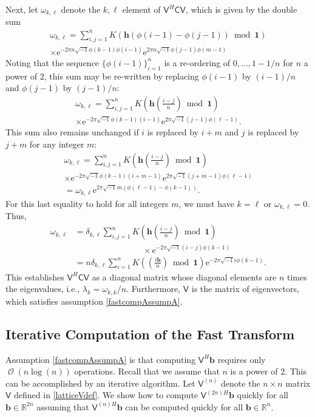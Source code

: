 \documentclass[twocolumn]{svjour3}          %
\DeclareMathOperator{\Order}{{\mathcal O}}
\newcommand{\bm}[1]{\boldsymbol{#1}}
\newcommand{\reals}{\mathbb{R}}
\newcommand{\vb}{\bm{b}}
\newcommand{\vh}{\bm{h}}
\newcommand{\vone}{\bm{1}}
\newcommand{\mC}{\mathsf{C}}
\newcommand{\mV}{\mathsf{V}}
\newcommand{\me}{\mathrm{e}}
\begin{document}
Next, let $\omega_{k, \ell}$ denote the $k,\ell$ element of $\mV^H \mC \mV$, which is given by the double sum
\begin{multline*}
\omega_{k, \ell} = \sum_{i,j=1}^n K(\vh(\phi(i-1) - \phi(j-1)) \bmod \vone ) \\
\times   \me^{-2 \pi n \sqrt{-1} \phi(k-1)\phi(i-1)}  \me^{2 \pi n \sqrt{-1} \phi(j-1)\phi(m-1)}
\end{multline*}
Noting that the sequence $\{\phi(i-1)\}_{i=1}^n$ is a re-ordering of $0, \ldots, 1-1/n$ for $n$ a power of $2$, this sum may be re-written by replacing $\phi(i-1)$ by $(i-1)/n$ and $\phi(j-1)$ by $(j-1)/n$:
\begin{multline*}
\omega_{k, \ell} = \sum_{i,j=1}^n K\left (\vh \left(\frac{i-j}{n} \right) \bmod \vone \right) \\
\times   \me^{-2 \pi \sqrt{-1} \phi(k-1)(i-1)}  \me^{2 \pi \sqrt{-1} (j-1)\phi(\ell-1)}.
\end{multline*}
This sum also remains unchanged if $i$ is replaced by $i+m$ and $j$ is replaced by $j+m$ for any integer $m$:
\begin{multline*}
\omega_{k, \ell} = \sum_{i,j=1}^n K\left (\vh \left(\frac{i-j}{n} \right) \bmod \vone \right) \\
\times   \me^{-2 \pi \sqrt{-1} \phi(k-1)(i+m-1)}  \me^{2 \pi \sqrt{-1} (j+m-1)\phi(\ell-1)} \\
=   \omega_{k, \ell}  \me^{2 \pi \sqrt{-1} m(\phi(\ell-1) - \phi(k-1))}.
\end{multline*}
For this last equality to hold for all integers $m$, we must have $k = \ell$ or $\omega_{k,\ell} = 0$.  Thus, 
\begin{align*}
\omega_{k, \ell} &= \delta_{k,\ell} \sum_{i,j=1}^n K\left (\vh \left(\frac{i-j}{n} \right) \bmod \vone \right) \\
& \qquad \qquad \qquad \qquad \times   \me^{-2 \pi \sqrt{-1} (i - j) \phi(k-1)} \\
& = n \delta_{k,\ell}  \sum_{i=1}^n K\left ( \left(\frac{i\vh}{n} \right) \bmod \vone \right)  \me^{-2 \pi \sqrt{-1} i \phi(k-1) }.
\end{align*}
This establishes $\mV^H \mC \mV$ as a diagonal matrix whose diagonal elements are $n$ times the eigenvalues, i.e., $\lambda_k = \omega_{k,k}/n$.  Furthermore, $\mV$ is the matrix of eigenvectors, which satisfies assumption \eqref{fastcompAssumpA}.

\subsection{Iterative Computation of the Fast Transform}
Assumption \eqref{fastcompAssumpA} is that computing $\mV^H \vb$ requires only $\Order(n \log(n)) $ operations.  Recall that we assume that $n$ is a power of $2$.  This can be accomplished by an iterative algorithm.  Let $\mV^{(n)}$ denote the $n \times n$ matrix $\mV$ defined in  \eqref{latticeVdef}.  We show how to compute $\mV^{(2n)H}\vb$ quickly for all $\vb \in \reals^{2n}$ assuming that $\mV^{(n)H}\vb$ can be computed quickly for all $\vb \in \reals^n$.
\end{document}
